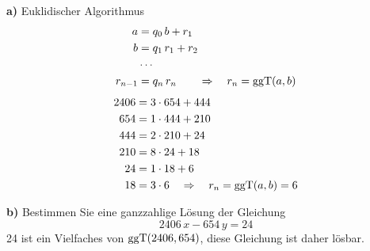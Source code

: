 \begin{loesung}
\textbf{a)} Euklidischer Algorithmus
\begin{align*}
a &= q_0\, b + r_1\\
b &= q_1\, r_1 + r_2\\
&\cdots\\
r_{n-1} &= q_n\, r_n \qquad \Rightarrow \quad r_n = \operatorname{ggT}(a, b)
\end{align*}
\begin{align*}
2406 &= 3 \cdot 654 + 444\\
654 &= 1 \cdot 444 + 210\\
444 &= 2 \cdot 210 + 24\\
210 &= 8 \cdot 24 + 18\\
24 &= 1 \cdot 18 + 6\\
18 &= 3 \cdot 6 \quad \Rightarrow \quad r_n = \operatorname{ggT}(a, b) = 6
\end{align*}

\textbf{b)} Bestimmen Sie eine ganzzahlige Lösung der Gleichung
\[ 2406\,x - 654\,y = 24 \]
24 ist ein Vielfaches von $\operatorname{ggT}(2406, 654)$, diese Gleichung ist daher lösbar.


\end{loesung}
